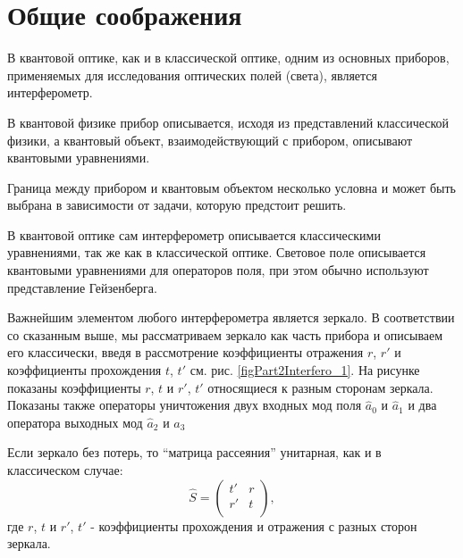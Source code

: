 \section{Общие соображения}
В квантовой оптике, как и в классической оптике, одним из основных
приборов, применяемых для исследования оптических полей (света),
является интерферометр.

В квантовой физике прибор описывается, исходя из представлений
классической физики, а квантовый объект, взаимодействующий с прибором,
описывают квантовыми уравнениями.

Граница между прибором и квантовым объектом несколько условна и может
быть выбрана в зависимости от задачи, которую предстоит решить. 

В квантовой оптике сам интерферометр описывается классическими
уравнениями, так же как в классической оптике. Световое поле
описывается квантовыми уравнениями для операторов поля, при этом
обычно используют представление Гейзенберга.

Важнейшим элементом любого интерферометра является зеркало. В
соответствии со сказанным выше, мы рассматриваем зеркало как часть
прибора и описываем его классически, введя в рассмотрение коэффициенты
отражения $r$, $r'$ и коэффициенты прохождения $t$, $t'$
см. рис. \ref{figPart2Interfero_1}. На рисунке показаны коэффициенты
$r$, $t$ и $r'$, $t'$ относящиеся к разным сторонам зеркала. Показаны
также операторы уничтожения двух входных мод поля $\hat{a}_0$ и
$\hat{a}_1$ и два оператора выходных мод $\hat{a}_2$ и $\hat{a}_3$



Если зеркало без потерь, то ``матрица рассеяния'' унитарная, как и в
классическом случае:
\[
\hat{S} = \left(
\begin{array}{cc}
t' & r \\
r' & t \\
\end{array}
\right),
\]
где $r$, $t$ и $r'$, $t'$ - коэффициенты прохождения и отражения с
разных сторон зеркала.

